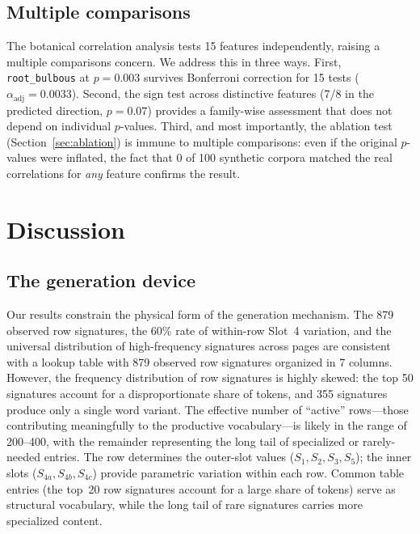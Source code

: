 \documentclass[12pt]{article}
\begin{document}
\subsection{Multiple comparisons}

The botanical correlation analysis tests 15 features independently, raising a multiple comparisons concern. We address this in three ways. First, \texttt{root\_bulbous} at $p = 0.003$ survives Bonferroni correction for 15 tests ($\alpha_{\text{adj}} = 0.0033$). Second, the sign test across distinctive features (7/8 in the predicted direction, $p = 0.07$) provides a family-wise assessment that does not depend on individual $p$-values. Third, and most importantly, the ablation test (Section~\ref{sec:ablation}) is immune to multiple comparisons: even if the original $p$-values were inflated, the fact that 0 of 100 synthetic corpora matched the real correlations for \emph{any} feature confirms the result.

\section{Discussion}
\label{sec:discussion}

\subsection{The generation device}

Our results constrain the physical form of the generation mechanism. The 879 observed row signatures, the 60\% rate of within-row Slot~4 variation, and the universal distribution of high-frequency signatures across pages are consistent with a lookup table with 879 observed row signatures organized in 7 columns. However, the frequency distribution of row signatures is highly skewed: the top 50 signatures account for a disproportionate share of tokens, and 355 signatures produce only a single word variant. The effective number of ``active'' rows---those contributing meaningfully to the productive vocabulary---is likely in the range of 200--400, with the remainder representing the long tail of specialized or rarely-needed entries. The row determines the outer-slot values ($S_1, S_2, S_3, S_5$); the inner slots ($S_{4a}, S_{4b}, S_{4c}$) provide parametric variation within each row. Common table entries (the top~20 row signatures account for a large share of tokens) serve as structural vocabulary, while the long tail of rare signatures carries more specialized content.
\end{document}
